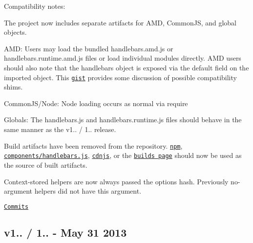 Compatibility notes\+:
\begin{DoxyItemize}
\item The project now includes separate artifacts for A\+MD, Common\+JS, and global objects.
\begin{DoxyItemize}
\item A\+MD\+: Users may load the bundled {\ttfamily handlebars.\+amd.\+js} or {\ttfamily handlebars.\+runtime.\+amd.\+js} files or load individual modules directly. A\+MD users should also note that the handlebars object is exposed via the {\ttfamily default} field on the imported object. This \href{https://gist.github.com/wycats/7417be0dc361a69d5916}{\tt gist} provides some discussion of possible compatibility shims.
\item Common\+J\+S/\+Node\+: Node loading occurs as normal via {\ttfamily require}
\item Globals\+: The {\ttfamily handlebars.\+js} and {\ttfamily handlebars.\+runtime.\+js} files should behave in the same manner as the v1.. / 1.. release.
\end{DoxyItemize}
\item Build artifacts have been removed from the repository. \href{https://npmjs.org/package/handlebars}{\tt npm}, \href{https://github.com/components/handlebars.js}{\tt components/handlebars.\+js}, \href{http://cdnjs.com/libraries/handlebars.js/}{\tt cdnjs}, or the \href{http://builds.handlebarsjs.com.s3.amazonaws.com/index.html}{\tt builds page} should now be used as the source of built artifacts.
\item Context-\/stored helpers are now always passed the {\ttfamily options} hash. Previously no-\/argument helpers did not have this argument.
\end{DoxyItemize}

\href{https://github.com/wycats/handlebars.js/compare/v1.0.12...v1.1.0}{\tt Commits}

\subsection*{v1.. / 1.. -\/ May 31 2013}


